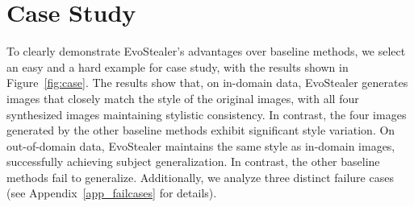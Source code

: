\section{Case Study}
To clearly demonstrate EvoStealer's advantages over baseline methods, we select an easy and a hard example for case study, with the results shown in Figure~\ref{fig:case}. The results show that, on in-domain data, EvoStealer generates images that closely match the style of the original images, with all four synthesized images maintaining stylistic consistency. In contrast, the four images generated by the other baseline methods exhibit significant style variation. On out-of-domain data, EvoStealer maintains the same style as in-domain images, successfully achieving subject generalization. In contrast, the other baseline methods fail to generalize. Additionally, we analyze three distinct failure cases (see Appendix~\ref{app_failcases} for details).
